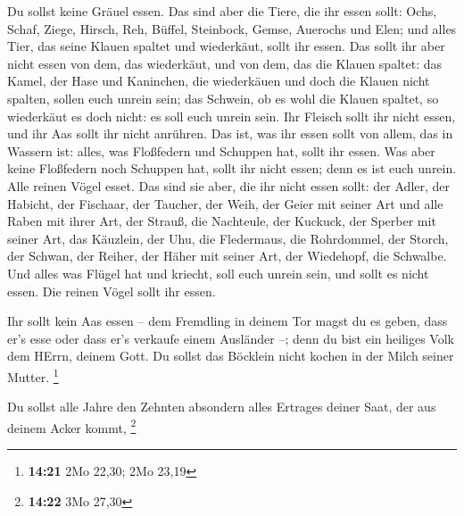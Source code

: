  Du sollst keine Gräuel essen.  Das sind aber
die Tiere, die ihr essen sollt: Ochs, Schaf, Ziege,  Hirsch,
Reh, Büffel, Steinbock, Gemse, Auerochs und Elen;  und alles
Tier, das seine Klauen spaltet und wiederkäut, sollt ihr essen.
 Das sollt ihr aber nicht essen von dem, das wiederkäut, und
von dem, das die Klauen spaltet: das Kamel, der Hase und Kaninchen, die
wiederkäuen und doch die Klauen nicht spalten, sollen euch unrein sein;
 das Schwein, ob es wohl die Klauen spaltet, so wiederkäut
es doch nicht: es soll euch unrein sein. Ihr Fleisch sollt ihr nicht
essen, und ihr Aas sollt ihr nicht anrühren.  Das ist, was
ihr essen sollt von allem, das in Wassern ist: alles, was Floßfedern und
Schuppen hat, sollt ihr essen.  Was aber keine Floßfedern
noch Schuppen hat, sollt ihr nicht essen; denn es ist euch unrein.
 Alle reinen Vögel esset.  Das sind sie aber,
die ihr nicht essen sollt: der Adler, der Habicht, der Fischaar,
 der Taucher, der Weih, der Geier mit seiner Art
 und alle Raben mit ihrer Art,  der Strauß,
die Nachteule, der Kuckuck, der Sperber mit seiner Art, 
das Käuzlein, der Uhu, die Fledermaus,  die Rohrdommel, der
Storch, der Schwan,  der Reiher, der Häher mit seiner Art,
der Wiedehopf, die Schwalbe.  Und alles was Flügel hat und
kriecht, soll euch unrein sein, und sollt es nicht essen. 
Die reinen Vögel sollt ihr essen.

 Ihr sollt kein Aas essen -- dem Fremdling in deinem Tor
magst du es geben, dass er's esse oder dass er's verkaufe einem
Ausländer --; denn du bist ein heiliges Volk dem HErrn, deinem Gott. Du
sollst das Böcklein nicht kochen in der Milch seiner Mutter. \footnote{\textbf{14:21}
  2Mo 22,30; 2Mo 23,19}

 Du sollst alle Jahre den Zehnten absondern alles Ertrages
deiner Saat, der aus deinem Acker kommt, \footnote{\textbf{14:22} 3Mo
  27,30}

